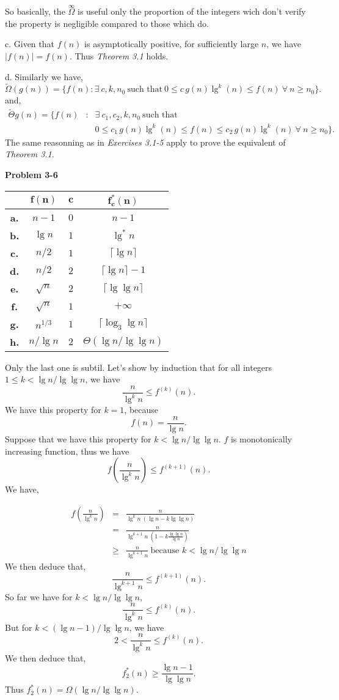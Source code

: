 \documentclass[a4paper,12pt]{article}
\newcommand{\newprob}[1]
{\bigskip \noindent \textbf{Problem #1} \newline}
\newcommand{\subpar}[1]
{\medskip \noindent #1.}
\begin{document}
So basically, the $\stackrel{\infty}{\Omega}$ is useful only the
proportion of the integers wich don't verify the property is
negligible compared to those which do.

\subpar{c}  Given that $f(n)$ is asymptotically positive, for sufficiently
large $n$, we have $|f(n)| = f(n)$.  Thus \emph{Theorem 3.1} holds.

\subpar{d} Similarly we have,
\[ \tilde{\Omega}(g(n)) = \{f(n): \exists\ c, k, n_0\ \mbox{such
  that}\ 0 \le c\,g(n) \lg^k(n) \le f(n)\ \forall\ n \ge n_0\}.\]
and,
\begin{eqnarray*}
\tilde{\Theta}{g(n)} = \{f(n)&:& \exists\ c_1, c_2, k, n_0\ 
\mbox{such that}\\
&& 0 \le c_1\,g(n) \lg^k(n) \le f(n) \le
c_2\,g(n) \lg^k(n)\ \forall\ n \ge n_0\}.
\end{eqnarray*}
The same reasonning as in \emph{Exercises 3.1-5} apply to prove the
equivalent of \emph{Theorem 3.1}.

\newprob{3-6}
\begin{tabular}{|c|c|c|c|}
\hline
&$\mathbf{f(n)}$&$\mathbf{c}$&$\mathbf{f_c^*(n)}$\\
\hline
\textbf{a.}&$n-1$&$0$&$n-1$\\
\hline
\textbf{b.}&$\lg n$&$1$&$\lg^*n$ \\
\hline
\textbf{c.}&$n/2$&$1$&$\lceil \lg n\rceil$ \\
\hline
\textbf{d.}&$n/2$&$2$&$\lceil \lg n\rceil - 1$ \\
\hline
\textbf{e.}&$\sqrt{n}$&$2$&$\lceil \lg \lg n\rceil$ \\
\hline
\textbf{f.}&$\sqrt{n}$&$1$&$+\infty$ \\
\hline
\textbf{g.}&$n^{1/3}$&$1$&$\lceil \log_3 \lg n\rceil$ \\
\hline
\textbf{h.}&$n/\lg n$&$2$&$\Theta(\lg n / \lg \lg n)$ \\
\hline
\end{tabular}

\medskip
Only the last one is subtil.  Let's show by induction that for all integers
$1\le k < \lg n/\lg \lg n$, we have
\[ \frac{n}{\lg^k n} \le f^{(k)}(n).\]
We have this property for $k=1$, because
\[ f(n) = \frac{n}{\lg n}.\]
Suppose that we have this property for $k < \lg n/\lg \lg n$.  $f$
is monotonically increasing function, thus we have
\[ f\left(\frac{n}{\lg^k n}\right) \le f^{(k+1)}(n).\]
We have,

\begin{eqnarray*}
f\left(\frac{n}{\lg^k n}\right) &=&
\frac{n}{\lg^k n\ (\lg n - k \lg \lg n)} \\
&=&\frac{n}{\lg^{k+1}n\ (1 - k \frac{\lg \lg n}{\lg n})} \\
&\ge& \frac{n}{\lg^{k+1}n}\ \mbox{because $k < \lg n /\lg \lg n$}
\end{eqnarray*}
We then deduce that,
\[ \frac{n}{\lg^{k+1}n} \le f^{(k+1)}(n).\]
So far we have for $k < \lg n / \lg \lg n$,
\[ \frac{n}{\lg^kn} \le f^{(k)}(n).\]
But for $k < (\lg n - 1)/\lg \lg n$, we have
\[ 2 < \frac{n}{\lg^k n} \le f^{(k)}(n).\]
We then deduce that,
\[ f^*_2(n) \ge \frac{\lg n - 1}{\lg \lg n}.\]
Thus $f^*_2(n) = \Omega(\lg n/\lg\lg n)$.
\end{document}

